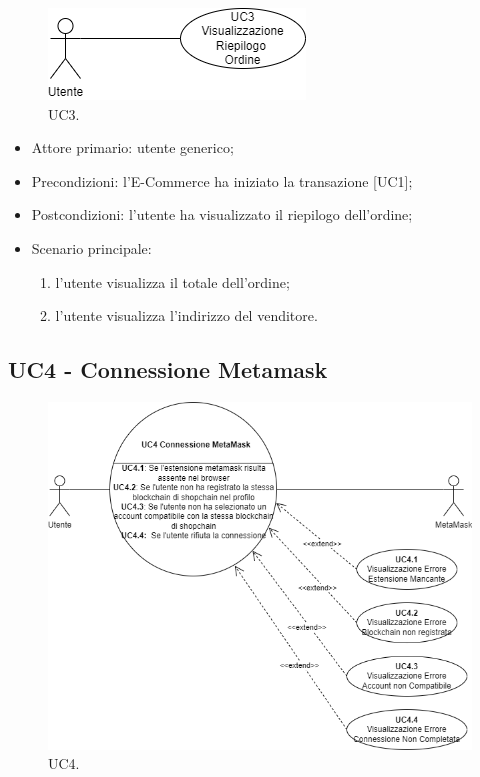\begin{figure}[H]
    \centering
    \includegraphics[scale=0.7]{immagini/UseCases-UC3.png}
    \caption{UC3.}
  \end{figure}

\begin{itemize}
    \item Attore primario: utente generico;
    \item Precondizioni: l'E-Commerce ha iniziato la transazione [UC1];
    \item Postcondizioni: l'utente ha visualizzato il riepilogo dell'ordine;
    \item Scenario principale:
    \begin{enumerate}
        \item l'utente visualizza il totale dell'ordine;
        \item l'utente visualizza l'indirizzo del venditore.
    \end{enumerate}
\end{itemize}

\subsection{UC4 - Connessione Metamask}

\begin{figure}[H]
    \centering
    \includegraphics[scale=0.7]{immagini/UseCases-UC4.png}
    \caption{UC4.}
  \end{figure}

